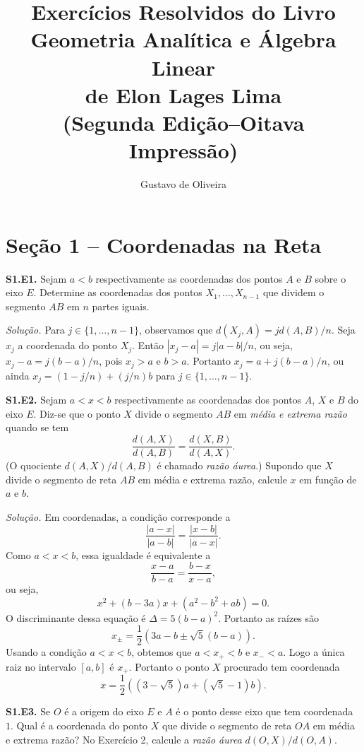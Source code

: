 \documentclass[a4paper,11pt]{article}
\title{Exercícios Resolvidos do Livro\\Geometria Analítica e Álgebra Linear\\de Elon Lages Lima\\(Segunda Edição--Oitava Impressão)}
\author{Gustavo de Oliveira}
\begin{document}
\maketitle

\section*{Seção 1 -- Coordenadas na Reta}

\textbf{S1.E1.}
Sejam $a < b$ respectivamente as coordenadas dos pontos $A$ e $B$ sobre o eixo $E$.
Determine as coordenadas dos pontos $X_1, \dots, X_{n-1}$ que dividem o segmento $AB$ em $n$ partes iguais.

\vspace{\baselineskip}

\emph{Solução.}
Para $j \in \{1, \dots, n-1 \}$, observamos que $d(X_j,A) = j d(A,B)/n$.
Seja $x_j$ a coordenada do ponto $X_j$.
Então $|x_j - a| = j|a-b|/n$, ou seja, $x_j - a = j(b-a)/n$, pois $x_j > a$ e $b > a$.
Portanto $x_j = a + j(b-a)/n$, ou ainda $x_j = (1-j/n) + (j/n)b$ para $j \in \{1, \dots, n-1 \}$.

\vspace{\baselineskip}

\textbf{S1.E2.}
Sejam $a < x < b$ respectivamente as coordenadas dos pontos $A$, $X$ e $B$ do eixo $E$.
Diz-se que o ponto $X$ divide o segmento $AB$ em \emph{média e extrema razão} quando se tem
\[
  \frac{d(A,X)}{d(A,B)} = \frac{d(X,B)}{d(A,X)}.
\]
(O quociente $d(A,X)/d(A,B)$ é chamado \emph{razão áurea}.)
Supondo que $X$ divide o segmento de reta $AB$ em média e extrema razão, calcule $x$ em função de $a$ e $b$.

\vspace{\baselineskip}

\emph{Solução.}
Em coordenadas, a condição corresponde a
\[
  \frac{|a-x|}{|a-b|} = \frac{|x-b|}{|a-x|}.
\]
Como $a < x < b$, essa igualdade é equivalente a
\[
  \frac{x-a}{b-a} = \frac{b-x}{x-a},
\]
ou seja,
\[
  x^2 + (b-3a) x + (a^2-b^2+ab) = 0.
\]
O discriminante dessa equação é $\Delta = 5(b-a)^2$.
Portanto as raízes são
\[
  x_{\pm} = \frac{1}{2} (3a - b \pm \sqrt{5}(b-a)).
\]
Usando a condição $a < x < b$, obtemos que $a < x_+ < b$ e $x_- < a$.
Logo a única raiz no intervalo $[a,b]$ é $x_+$.
Portanto o ponto $X$ procurado tem coordenada
\[
  x = \frac{1}{2} ( (3-\sqrt{5}) a + (\sqrt{5}-1) b ).
\]

\vspace{\baselineskip}

\textbf{S1.E3.}
Se $O$ é a origem do eixo $E$ e $A$ é o ponto desse eixo que tem coordenada $1$.
Qual é a coordenada do ponto $X$ que divide o segmento de reta $OA$ em média e extrema razão?
No Exercício 2, calcule a \emph{razão áurea} $d(O,X)/d(O,A)$.
\end{document}

